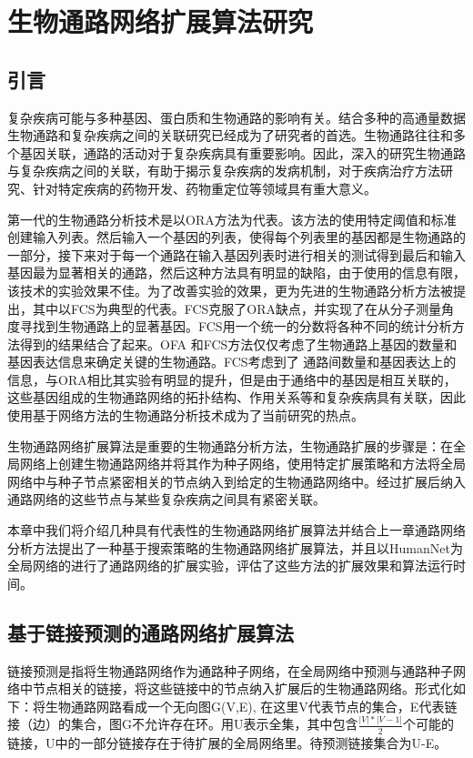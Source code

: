 \chapter{生物通路网络扩展算法研究}
\section{引言}
复杂疾病可能与多种基因、蛋白质和生物通路的影响有关\cite{zhang2016network}。结合多种的高通量数据生物通路和复杂疾病之间的关联研究已经成为了研究者的首选。生物通路往往和多个基因关联，通路的活动对于复杂疾病具有重要影响。因此，深入的研究生物通路与复杂疾病之间的关联，有助于揭示复杂疾病的发病机制，对于疾病治疗方法研究、针对特定疾病的药物开发、药物重定位等领域具有重大意义。

第一代的生物通路分析技术是以ORA\cite{goeman2007analyzing}方法为代表。该方法的使用特定阈值和标准创建输入列表。然后输入一个基因的列表，使得每个列表里的基因都是生物通路的一部分，接下来对于每一个通路在输入基因列表时进行相关的测试得到最后和输入基因最为显著相关的通路，然后这种方法具有明显的缺陷，由于使用的信息有限，该技术的实验效果不佳。为了改善实验的效果，更为先进的生物通路分析方法被提出，其中以FCS\cite{lee2011prioritizing}为典型的代表。FCS克服了ORA缺点，并实现了在从分子测量角度寻找到生物通路上的显著基因。FCS用一个统一的分数将各种不同的统计分析方法得到的结果结合了起来。OFA 和FCS方法仅仅考虑了生物通路上基因的数量和基因表达信息来确定关键的生物通路。FCS\cite{lee2011prioritizing}考虑到了
通路间数量和基因表达上的信息，与ORA相比其实验有明显的提升，但是由于通络中的基因是相互关联的，这些基因组成的生物通路网络的拓扑结构、作用关系等和复杂疾病具有关联，因此使用基于网络方法的生物通路分析技术成为了当前研究的热点。

生物通路网络扩展算法是重要的生物通路分析方法，生物通路扩展的步骤是：在全局网络上创建生物通路网络并将其作为种子网络，使用特定扩展策略和方法将全局网络中与种子节点紧密相关的节点纳入到给定的生物通路网络中。经过扩展后纳入通路网络的这些节点与某些复杂疾病之间具有紧密关联。

本章中我们将介绍几种具有代表性的生物通路网络扩展算法并结合上一章通路网络分析方法提出了一种基于搜索策略的生物通路网络扩展算法，并且以HumanNet为全局网络的进行了通路网络的扩展实验，评估了这些方法的扩展效果和算法运行时间。

\section{基于链接预测的通路网络扩展算法}
链接预测是指将生物通路网络作为通路种子网络，在全局网络中预测与通路种子网络中节点相关的链接，将这些链接中的节点纳入扩展后的生物通路网络。形式化如下：将生物通路网路看成一个无向图G(V,E), 在这里V代表节点的集合，E代表链接（边）的集合，图G不允许存在环。用U表示全集，其中包含$\frac{|V|*|V-1|}{2}$个可能的链接，U中的一部分链接存在于待扩展的全局网络里。待预测链接集合为U-E。

